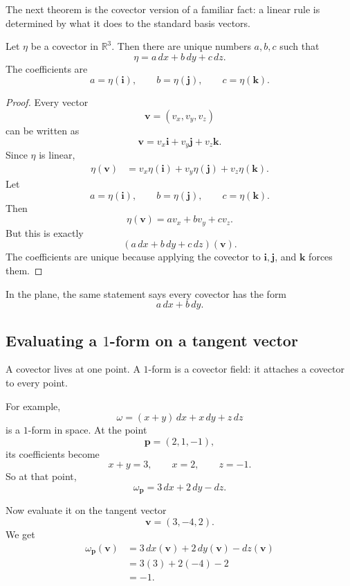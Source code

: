 The next theorem is the covector version of a familiar fact: a linear rule is determined
by what it does to the standard basis vectors.

\begin{theorem}
Let \(\eta\) be a covector in \(\mathbb R^3\).  Then there are unique numbers
\(a,b,c\) such that
\[
\boxed{
    \eta=a\,dx+b\,dy+c\,dz.
}
\]
The coefficients are
\[
\boxed{
    a=\eta(\mathbf i),
    \qquad
    b=\eta(\mathbf j),
    \qquad
    c=\eta(\mathbf k).
}
\]
\end{theorem}

\begin{proof}
Every vector
\[
    \mathbf v=(v_x,v_y,v_z)
\]
can be written as
\[
    \mathbf v=v_x\mathbf i+v_y\mathbf j+v_z\mathbf k.
\]
Since \(\eta\) is linear,
\[
\begin{aligned}
    \eta(\mathbf v)
    &=
    v_x\eta(\mathbf i)+v_y\eta(\mathbf j)+v_z\eta(\mathbf k).
\end{aligned}
\]
Let
\[
    a=\eta(\mathbf i),
    \qquad
    b=\eta(\mathbf j),
    \qquad
    c=\eta(\mathbf k).
\]
Then
\[
    \eta(\mathbf v)=av_x+bv_y+cv_z.
\]
But this is exactly
\[
    (a\,dx+b\,dy+c\,dz)(\mathbf v).
\]
The coefficients are unique because applying the covector to \(\mathbf i,\mathbf j\),
and \(\mathbf k\) forces them.
\end{proof}

In the plane, the same statement says every covector has the form
\[
    a\,dx+b\,dy.
\]

\subsection{Evaluating a \texorpdfstring{\(1\)}{1}-form on a tangent vector}

A covector lives at one point.  A \(1\)-form is a covector field: it attaches a covector
to every point.

For example,
\[
    \omega=(x+y)\,dx+x\,dy+z\,dz
\]
is a \(1\)-form in space.  At the point
\[
    \mathbf p=(2,1,-1),
\]
its coefficients become
\[
    x+y=3,
    \qquad
    x=2,
    \qquad
    z=-1.
\]
So at that point,
\[
    \omega_{\mathbf p}=3\,dx+2\,dy-dz.
\]

Now evaluate it on the tangent vector
\[
    \mathbf v=(3,-4,2).
\]
We get
\[
\begin{aligned}
    \omega_{\mathbf p}(\mathbf v)
    &=
    3\,dx(\mathbf v)+2\,dy(\mathbf v)-dz(\mathbf v)\\
    &=
    3(3)+2(-4)-2\\
    &=
    -1.
\end{aligned}
\]

